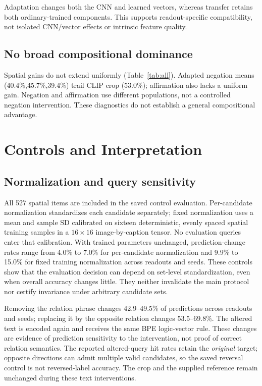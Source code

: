 \documentclass[10pt,twocolumn,letterpaper]{article}
\begin{document}
Adaptation changes both the CNN and learned vectors, whereas transfer retains both ordinary-trained components. This supports readout-specific compatibility, not isolated CNN/vector effects or intrinsic feature quality.

\subsection{No broad compositional dominance}
Spatial gains do not extend uniformly (Table~\ref{tab:all}). Adapted negation means (40.4\%,45.7\%,39.4\%) trail CLIP crop (53.0\%); affirmation also lacks a uniform gain. Negation and affirmation use different populations, not a controlled negation intervention. These diagnostics do not establish a general compositional advantage.
\clearpage

\section{Controls and Interpretation}
\subsection{Normalization and query sensitivity}
All 527 spatial items are included in the saved control evaluation. Per-candidate normalization standardizes each candidate separately; fixed normalization uses a mean and sample SD calibrated on sixteen deterministic, evenly spaced spatial training samples in a $16\times16$ image-by-caption tensor. No evaluation queries enter that calibration. With trained parameters unchanged, prediction-change rates range from 4.0\% to 7.0\% for per-candidate normalization and 9.9\% to 15.0\% for fixed training normalization across readouts and seeds. These controls show that the evaluation decision can depend on set-level standardization, even when overall accuracy changes little. They neither invalidate the main protocol nor certify invariance under arbitrary candidate sets.

Removing the relation phrase changes 42.9--49.5\% of predictions across readouts and seeds; replacing it by the opposite relation changes 53.5--69.8\%. The altered text is encoded again and receives the same BPE logic-vector rule. These changes are evidence of prediction sensitivity to the intervention, not proof of correct relation semantics. The reported altered-query hit rates retain the \emph{original} target; opposite directions can admit multiple valid candidates, so the saved reversal control is not reversed-label accuracy. The crop and the supplied reference remain unchanged during these text interventions.
\end{document}
